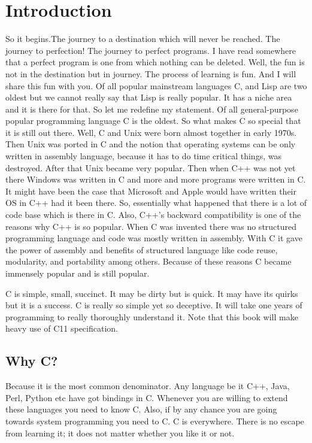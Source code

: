 \chapter{Introduction}
So it begins.The journey to a destination which will never be reached. The
journey to perfection! The journey to perfect programs. I have read somewhere
that a perfect program is one from which nothing can be deleted. Well, the fun
is not in the destination but in journey. The process of learning is fun. And I
will share this fun with you. Of all popular mainstream languages C, and Lisp
are two oldest but we cannot really say that Lisp is really popular. It has a
niche area and it is there for that. So let me redefine my statement. Of all
general-purpose popular programming language C is the oldest. So what makes C
so special that it is still out there. Well, C and Unix were born almost
together in early 1970s. Then Unix was ported in C and the notion that
operating systems can be only written in assembly language, because it has to
do time critical things, was destroyed. After that Unix became very
popular. Then when C++ was not yet there Windows was written in C and more and
more programs were written in C. It might have been the case that Microsoft and
Apple would have written their OS in C++ had it been there. So, essentially
what happened that there is a lot of code base which is there in C. Also, C++'s
backward compatibility is one of the reasons why C++ is so popular. When C was
invented there was no structured programming language and code was mostly
written in assembly. With C it gave the power of assembly and benefits of
structured language like code reuse, modularity, and portability among
others. Because of these reasons C became immensely popular and is still
popular.

C is simple, small, succinct. It may be dirty but is quick. It may have its
quirks but it is a success. C is really so simple yet so deceptive. It will
take one years of programming to really thoroughly understand it. Note that
this book will make heavy use of C11 specification.

\section{Why C?}
Because it is the most common denominator. Any language be it C++, Java, Perl,
Python etc have got bindings in C. Whenever you are willing to extend these
languages you need to know C. Also, if by any chance you are going towards
system programming you need to C. C is everywhere. There is no escape from
learning it; it does not matter whether you like it or not.

